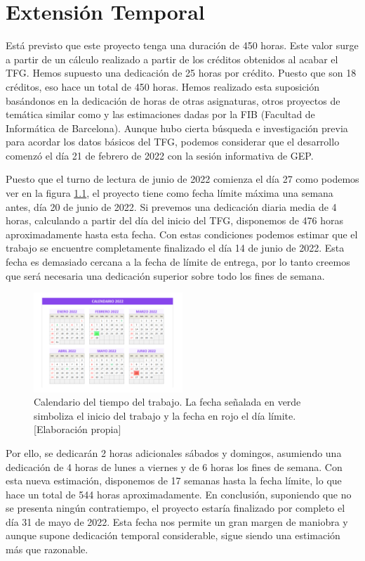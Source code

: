 \chapter{Extensión Temporal}
Está previsto que este proyecto tenga una duración de 450 horas. Este valor surge a partir de un cálculo realizado a partir de los créditos obtenidos al acabar el TFG. Hemos supuesto una dedicación de 25 horas por crédito. Puesto que son 18 créditos, eso hace un total de 450 horas. Hemos realizado esta suposición basándonos en la dedicación de horas de otras asignaturas, otros proyectos de temática similar como \cite{wow-upc} \cite{netlogo} y las estimaciones dadas por la FIB (Facultad de Informática de Barcelona)\cite{fib_tfg}. Aunque hubo cierta búsqueda e investigación previa para acordar los datos básicos del TFG, podemos considerar que el desarrollo comenzó el día 21 de febrero de 2022 con la sesión informativa de GEP.   

Puesto que el turno de lectura de junio de 2022 comienza el día 27 \cite{fib_tfg} como podemos ver en la figura \ref{fig:fechas}, el proyecto tiene como fecha límite máxima una semana antes, día 20 de junio de 2022. Si prevemos una dedicación diaria media de 4 horas, calculando a partir del día del inicio del TFG, disponemos de 476 horas aproximadamente hasta esta fecha. Con estas condiciones podemos estimar que el trabajo se encuentre completamente finalizado el día 14 de junio de 2022. Esta fecha es demasiado cercana a la fecha de límite de entrega, por lo tanto creemos que será necesaria una dedicación superior sobre todo los fines de semana.  

\begin{figure}[h]
    \centering
    \includegraphics[width=0.5\textwidth]{img/fechas.png}
    \caption{Calendario del tiempo del trabajo. La fecha señalada en verde simboliza el inicio del trabajo y la fecha en rojo el día límite. [Elaboración propia]}
    \label{fig:fechas}
\end{figure}

Por ello, se dedicarán 2 horas adicionales sábados y domingos, asumiendo una dedicación de 4 horas de lunes a viernes y de 6 horas los fines de semana. Con esta nueva estimación, disponemos de 17 semanas hasta la fecha límite, lo que hace un total de 544 horas aproximadamente. En conclusión, suponiendo que no se presenta ningún contratiempo, el proyecto estaría finalizado por completo el día 31 de mayo de 2022. Esta fecha nos permite un gran margen de maniobra y aunque supone dedicación temporal considerable, sigue siendo una estimación más que razonable.


